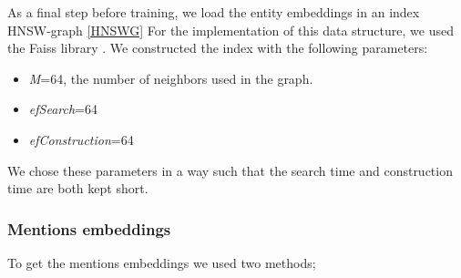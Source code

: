 As a final step before training, we load the entity embeddings in an index HNSW-graph \ref{HNSWG}
For the implementation of this data structure, we used the Faiss library \cite{FAISS}. We constructed the index with the following parameters:
\begin{itemize}
\item{\textit{M}=64, the number of neighbors used in the graph.}
\item{\textit{efSearch}=64}
\item{\textit{efConstruction}=64}
\end{itemize}
We chose these parameters in a way such that the search time and construction time are both kept short.

\subsubsection{Mentions embeddings}
\label{MenEmb}
To get the mentions embeddings we used two methods;

